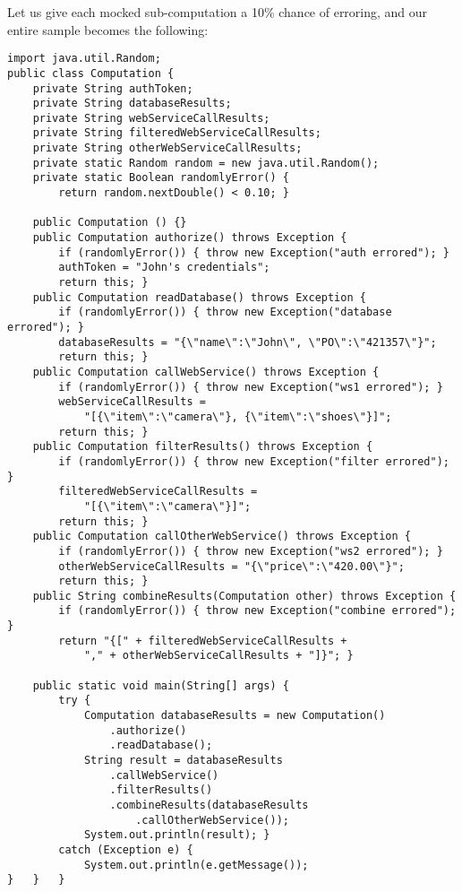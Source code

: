 \documentclass[11pt]{article}
\begin{document}
Let us give each mocked sub-computation a \mbox{10\%} chance of
erroring, and our entire sample becomes the following:
\begin{verbatim}
import java.util.Random;
public class Computation {
    private String authToken;
    private String databaseResults;
    private String webServiceCallResults;
    private String filteredWebServiceCallResults;
    private String otherWebServiceCallResults;
    private static Random random = new java.util.Random();
    private static Boolean randomlyError() {
        return random.nextDouble() < 0.10; }

    public Computation () {}
    public Computation authorize() throws Exception {
        if (randomlyError()) { throw new Exception("auth errored"); }
        authToken = "John's credentials";
        return this; }
    public Computation readDatabase() throws Exception {
        if (randomlyError()) { throw new Exception("database errored"); }
        databaseResults = "{\"name\":\"John\", \"PO\":\"421357\"}";
        return this; }
    public Computation callWebService() throws Exception {
        if (randomlyError()) { throw new Exception("ws1 errored"); }
        webServiceCallResults =
            "[{\"item\":\"camera\"}, {\"item\":\"shoes\"}]";
        return this; }
    public Computation filterResults() throws Exception {
        if (randomlyError()) { throw new Exception("filter errored"); }
        filteredWebServiceCallResults =
            "[{\"item\":\"camera\"}]";
        return this; }
    public Computation callOtherWebService() throws Exception {
        if (randomlyError()) { throw new Exception("ws2 errored"); }
        otherWebServiceCallResults = "{\"price\":\"420.00\"}";
        return this; }
    public String combineResults(Computation other) throws Exception {
        if (randomlyError()) { throw new Exception("combine errored"); }
        return "{[" + filteredWebServiceCallResults +
            "," + otherWebServiceCallResults + "]}"; }

    public static void main(String[] args) {
        try {
            Computation databaseResults = new Computation()
                .authorize()
                .readDatabase();
            String result = databaseResults
                .callWebService()
                .filterResults()
                .combineResults(databaseResults
                    .callOtherWebService());
            System.out.println(result); }
        catch (Exception e) {
            System.out.println(e.getMessage());
}   }   }
\end{verbatim}
\end{document}
